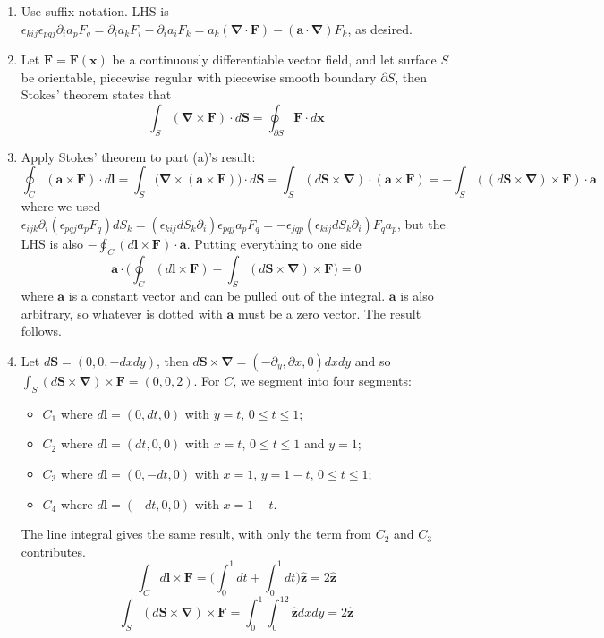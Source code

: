 \documentclass[a4paper]{article}
\begin{document}
\begin{ans}\leavevmode
\begin{enumerate}[label=(\alph*)]
    \item Use suffix notation. LHS is $\epsilon_{kij}\epsilon_{pqj}\partial_ia_pF_q=\partial_ia_kF_i-\partial_ia_iF_k=a_k(\boldsymbol{\nabla}\cdot\mathbf{F})-(\mathbf{a}\cdot\boldsymbol{\nabla})F_k$, as desired.
    \item Let $\mathbf{F}=\mathbf{F}(\mathbf{x})$ be a continuously differentiable vector field, and let surface $S$ be orientable, piecewise regular with piecewise smooth boundary $\partial S$, then Stokes' theorem states that
$$\int_S(\boldsymbol{\nabla}\times\mathbf{F})\cdot d\mathbf{S}=\oint_{\partial S}\mathbf{F}\cdot d\mathbf{x}$$
    \item Apply Stokes' theorem to part (a)'s result:
$$\oint_C(\mathbf{a}\times\mathbf{F})\cdot d\mathbf{l}=\int_S\bigg(\boldsymbol{\nabla}\times(\mathbf{a}\times\mathbf{F})\bigg)\cdot d\mathbf{S}=\int_S(d\mathbf{S}\times\boldsymbol{\nabla})\cdot(\mathbf{a}\times\mathbf{F})=-\int_S((d\mathbf{S}\times\boldsymbol{\nabla})\times\mathbf{F})\cdot \mathbf{a}$$
where we used $\epsilon_{ijk}\partial_i(\epsilon_{pqj}a_pF_q)dS_k=(\epsilon_{kij}dS_k\partial_i)\epsilon_{pqj}a_pF_q= -\epsilon_{jqp}(\epsilon_{kij}dS_k\partial_i)F_qa_p$, but the LHS is also $-\oint_C( d\mathbf{l}\times\mathbf{F})\cdot\mathbf{a}$. Putting everything to one side
$$\mathbf{a}\cdot\bigg(\oint_C(d\mathbf{l}\times\mathbf{F})-\int_S(d\mathbf{S}\times\boldsymbol{\nabla})\times\mathbf{F}\bigg)=0$$
where $\mathbf{a}$ is a constant vector and can be pulled out of the integral. $\mathbf{a}$ is also arbitrary, so whatever is dotted with $\mathbf{a}$ must be a zero vector. The result follows.
\item Let $d\mathbf{S}=(0,0,-dxdy)$, then $d\mathbf{S}\times\boldsymbol{\nabla}=(-\partial_y,\partial x,0)dxdy$ and so $\int_S(d\mathbf{S}\times\boldsymbol{\nabla})\times\mathbf{F}=(0,0,2)$. For $C$, we segment into four segments: 
\begin{itemize}
    \item $C_1$ where $d\mathbf{l}=(0,dt,0)$ with $y=t$, $0\leq t\leq 1$;
    \item $C_2$ where $d\mathbf{l}=(dt,0,0)$ with $x=t$, $0\leq t\leq 1$ and $y=1$;
    \item $C_3$ where $d\mathbf{l}=(0,-dt,0)$ with $x=1$, $y=1-t$, $0\leq t\leq 1$;
    \item $C_4$ where $d\mathbf{l}=(-dt,0,0)$ with $x=1-t$.
\end{itemize}
The line integral gives the same result, with only the term from $C_2$ and $C_3$ contributes.
$$\int_Cd\mathbf{l}\times\mathbf{F}=\bigg(\int_0^1dt+\int_0^1dt\bigg)\mathbf{\hat{z}}=2\mathbf{\hat{z}}$$
$$\int_S(d\mathbf{S}\times\boldsymbol{\nabla})\times\mathbf{F}=\int_0^1\int_0^12\mathbf{\hat{z}}dxdy=2\mathbf{\hat{z}}$$
\end{enumerate}
\end{ans}
\end{document}
